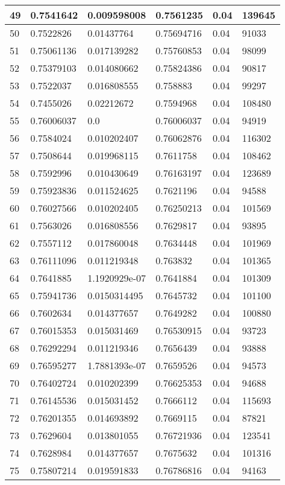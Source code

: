 \begin{longtable}{|l|l|l|l|l|l|}
49 & 0.7541642 & 0.009598008 & 0.7561235 & 0.04 & 139645 \\ \hline 
50 & 0.7522826 & 0.01437764 & 0.75694716 & 0.04 & 91033 \\ \hline 
51 & 0.75061136 & 0.017139282 & 0.75760853 & 0.04 & 98099 \\ \hline 
52 & 0.75379103 & 0.014080662 & 0.75824386 & 0.04 & 90817 \\ \hline 
53 & 0.7522037 & 0.016808555 & 0.758883 & 0.04 & 99297 \\ \hline 
54 & 0.7455026 & 0.02212672 & 0.7594968 & 0.04 & 108480 \\ \hline 
55 & 0.76006037 & 0.0 & 0.76006037 & 0.04 & 94919 \\ \hline 
56 & 0.7584024 & 0.010202407 & 0.76062876 & 0.04 & 116302 \\ \hline 
57 & 0.7508644 & 0.019968115 & 0.7611758 & 0.04 & 108462 \\ \hline 
58 & 0.7592996 & 0.010430649 & 0.76163197 & 0.04 & 123689 \\ \hline 
59 & 0.75923836 & 0.011524625 & 0.7621196 & 0.04 & 94588 \\ \hline 
60 & 0.76027566 & 0.010202405 & 0.76250213 & 0.04 & 101569 \\ \hline 
61 & 0.7563026 & 0.016808556 & 0.7629817 & 0.04 & 93895 \\ \hline 
62 & 0.7557112 & 0.017860048 & 0.7634448 & 0.04 & 101969 \\ \hline 
63 & 0.76111096 & 0.011219348 & 0.763832 & 0.04 & 101365 \\ \hline 
64 & 0.7641885 & 1.1920929e-07 & 0.7641884 & 0.04 & 101309 \\ \hline 
65 & 0.75941736 & 0.0150314495 & 0.7645732 & 0.04 & 101100 \\ \hline 
66 & 0.7602634 & 0.014377657 & 0.7649282 & 0.04 & 100880 \\ \hline 
67 & 0.76015353 & 0.015031469 & 0.76530915 & 0.04 & 93723 \\ \hline 
68 & 0.76292294 & 0.011219346 & 0.7656439 & 0.04 & 93888 \\ \hline 
69 & 0.76595277 & 1.7881393e-07 & 0.7659526 & 0.04 & 94573 \\ \hline 
70 & 0.76402724 & 0.010202399 & 0.76625353 & 0.04 & 94688 \\ \hline 
71 & 0.76145536 & 0.015031452 & 0.7666112 & 0.04 & 115693 \\ \hline 
72 & 0.76201355 & 0.014693892 & 0.7669115 & 0.04 & 87821 \\ \hline 
73 & 0.7629604 & 0.013801055 & 0.76721936 & 0.04 & 123541 \\ \hline 
74 & 0.7628984 & 0.014377657 & 0.7675632 & 0.04 & 101316 \\ \hline 
75 & 0.75807214 & 0.019591833 & 0.76786816 & 0.04 & 94163 \\ \hline 
\end{longtable}